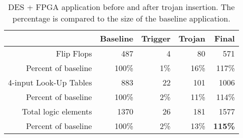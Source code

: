 \begin{table}[htbp]
  \centering
  \caption{DES + FPGA application before and after trojan insertion. The percentage is compared to the size of the baseline application. }
    \begin{tabular}{rrrrr}
    \toprule
               & Baseline   & Trigger    & Trojan     & Final  \\
    \midrule
    Flip Flops & 487        & 4          & 80         & 571 \\
    Percent of baseline & 100\%      & 1\%        & 16\%       & 117\% \\
    \midrule
    4-input Look-Up Tables & 883        & 22         & 101        & 1006 \\
    Percent of baseline & 100\%      & 2\%        & 11\%       & 114\% \\
    \midrule
    Total logic elements & 1370       & 26         & 181        & 1577 \\
    Percent of baseline & 100\%      & 2\%        & 13\%       & \textbf{115\%} \\
    \bottomrule
    \end{tabular}%
  \label{tab:size}%
\end{table}%

